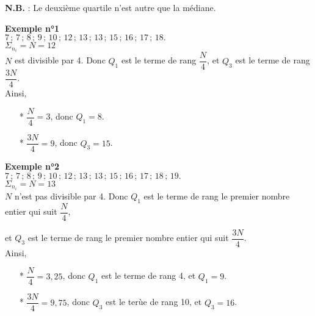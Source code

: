 \vspace*{.3cm}

\textbf{N.B.} : Le deuxième quartile n'est autre que la médiane.

\vspace*{.3cm}

\textbf{Exemple n°1} \\

$ 7 \, ; \,  7 \, ; \,  8 \, ; \,  9 \, ; \,  10 \, ; \,  12 \, ; \,  13 \, ; \,  13 \, ; \,  15 \, ; \,  16 \, ; \,  17 \, ; \,  18.$ \\

$\Sigma_{n_i} = N = 12$ \\

$N$ est divisible par 4. Donc $Q_1$ est le terme de rang $\dfrac{N}{4}$, et $Q_3$ est le terme de rang $\dfrac{3N}{4}$. \\

Ainsi,  \\

\begin{itemize}
\item[*] $\dfrac{N}{4} = 3$, donc $Q_1 = 8$.
\\
\item[*] $ \dfrac{3N}{4} = 9$, donc $Q_3 = 15$.
\end{itemize}

\vspace*{.3cm}

\textbf{Exemple n°2} \\

$ 7 \, ; \,  7 \, ; \,  8 \, ; \,  9 \, ; \,  10 \, ; \,  12 \, ; \,  13 \, ; \,  13 \, ; \,  15 \, ; \,  16 \, ; \,  17 \, ; \,  18 \, ; \,  19.$ \\

$\Sigma_{n_i} = N = 13$ \\

$N$ n'est pas divisible par 4. Donc $Q_1$ est le terme de rang le premier nombre entier qui suit $\dfrac{N}{4}$, 

et $Q_3$ est le terme de rang le premier nombre entier qui suit $\dfrac{3N}{4}$. \\

Ainsi,  \\

\begin{itemize}
\item[*] $\dfrac{N}{4} = 3,25$, donc $Q_1$ est le terme de rang 4, et $Q_1 = 9$.
\\
\item[*] $ \dfrac{3N}{4} = 9,75$, donc $Q_3$ est le terùe de rang 10, et $Q_3 = 16$.
\end{itemize}


